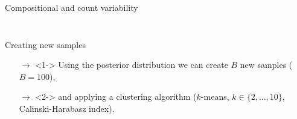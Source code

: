 \documentclass[9pt]{beamer}
\begin{document}
\begin{frame}[t]{Compositional and count variability}
\begin{columns}
\begin{column}{0.5\textwidth}
\begin{figure}
%
%
\end{figure}
\end{column}
\end{columns}

\vspace{-0.26cm}
\begin{exampleblock}{Creating new samples}
\begin{itemize}
\item[$\rightarrow$]<1-> Using the posterior distribution we can create  $B$  new samples ($B=100$),
\item[$\rightarrow$]<2-> and applying a clustering algorithm ($k$-means, $k\in\{2,\dots,10\}$, Calinski-Harabasz index).
\end{itemize}
\end{exampleblock}

\end{frame}
\end{document}
